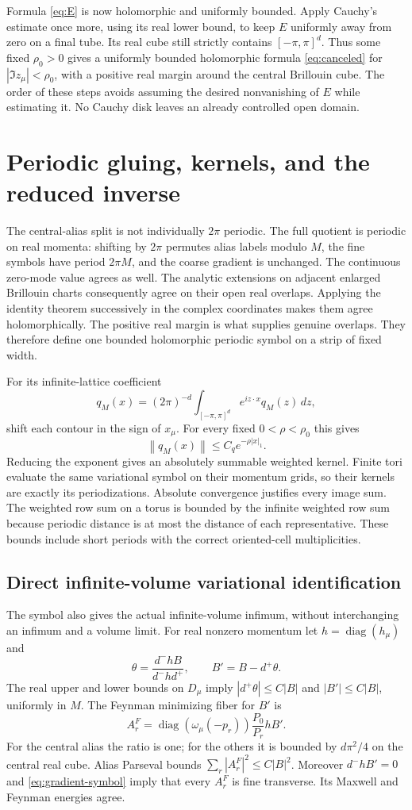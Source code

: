 \documentclass[11pt]{article}
\theoremstyle{remark}
\newcommand{\norm}[1]{\left\|#1\right\|}
\newcommand{\diag}{\operatorname{diag}}
\begin{document}
Formula \eqref{eq:E} is now holomorphic and uniformly bounded.
Apply Cauchy's estimate once more, using its real lower bound, to keep
$E$ uniformly away from zero on a final tube. Its real cube still
strictly contains $[-\pi,\pi]^d$. Thus some fixed $\rho_0>0$ gives
a uniformly bounded holomorphic formula \eqref{eq:canceled} for
$|\Im z_\mu|<\rho_0$, with a positive real margin around the central
Brillouin cube. The order of these steps avoids assuming the desired
nonvanishing of $E$ while estimating it. No Cauchy disk leaves an
already controlled open domain.

\section{Periodic gluing, kernels, and the reduced inverse}

The central-alias split is not individually $2\pi$ periodic.
The full quotient is periodic on real momenta: shifting by $2\pi$
permutes alias labels modulo $M$, the fine symbols have period
$2\pi M$, and the coarse gradient is unchanged. The continuous
zero-mode value agrees as well. The analytic extensions on adjacent
enlarged Brillouin charts consequently agree on their open real
overlaps. Applying the identity theorem successively in the complex
coordinates makes them agree holomorphically. The positive real margin
is what supplies genuine overlaps. They therefore define one bounded
holomorphic periodic symbol on a strip of fixed width.

For its infinite-lattice coefficient
\[
 q_M(x)=(2\pi)^{-d}\int_{[-\pi,\pi]^d}e^{iz\cdot x}q_M(z)\,dz,
\]
shift each contour in the sign of $x_\mu$. For every fixed
$0<\rho<\rho_0$ this gives
\[
 \norm{q_M(x)}\le C_qe^{-\rho|x|_1}.
\]
Reducing the exponent gives an absolutely summable weighted kernel.
Finite tori evaluate the same variational symbol on their momentum
grids, so their kernels are exactly its periodizations. Absolute
convergence justifies every image sum. The weighted row sum on a
torus is bounded by the infinite weighted row sum because periodic
distance is at most the distance of each representative. These
bounds include short periods with the correct oriented-cell
multiplicities.

\subsection{Direct infinite-volume variational identification}

The symbol also gives the actual infinite-volume infimum, without
interchanging an infimum and a volume limit. For real nonzero momentum
let $h=\diag(h_\mu)$ and
\[
 \theta=\frac{d^-hB}{d^-hd^+},\qquad B'=B-d^+\theta.
\]
The real upper and lower bounds on $D_\mu$ imply
$|d^+\theta|\le C|B|$ and $|B'|\le C|B|$, uniformly in $M$.
The Feynman minimizing fiber for $B'$ is
\[
 A_r^F=\diag(\omega_\mu(-p_r))\frac{P_0}{P_r}hB'.
\]
For the central alias the ratio is one; for the others it is bounded
by $d\pi^2/4$ on the central real cube. Alias Parseval bounds
$\sum_r|A_r^F|^2\le C|B|^2$.
Moreover $d^-hB'=0$ and \eqref{eq:gradient-symbol} imply that every
$A_r^F$ is fine transverse. Its Maxwell and Feynman energies agree.
\end{document}
